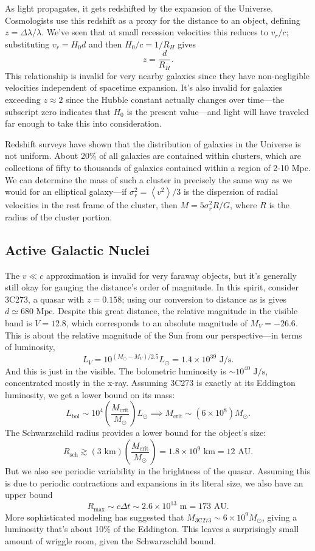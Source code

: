 \documentclass[../a062main.tex]{subfiles}
\begin{document}
As light propagates, it gets redshifted by the expansion of the Universe.
Cosmologists use this redshift as a proxy for the distance to an object, defining $z = \Delta \lambda / \lambda$.
We've seen that at small recession velocities this reduces to $v_r / c$; substituting $v_r = H_0d$ and then $H_0 / c = 1 / R_H$ gives
\[ \boxed{z = \frac{d}{R_H}}. \]
This relationship is invalid for very nearby galaxies since they have non-negligible velocities independent of spacetime expansion.
It's also invalid for galaxies exceeding $z \approx 2$ since the Hubble constant actually changes over time---the subscript zero indicates that $H_0$ is the present value---and light will have traveled far enough to take this into consideration.

Redshift surveys have shown that the distribution of galaxies in the Universe is not uniform.
About 20\% of all galaxies are contained within clusters, which are collections of fifty to thousands of galaxies contained within a region of 2-10 Mpc.
We can determine the mass of such a cluster in precisely the same way as we would for an elliptical galaxy---if $\sigma_r^2 = \left< v^2 \right> / 3$ is the dispersion of radial velocities in the rest frame of the cluster, then $M = 5 \sigma_r^2 R / G$, where $R$ is the radius of the cluster portion.


\subsection*{Active Galactic Nuclei}
The $v \ll c$ approximation is invalid for very faraway objects, but it's generally still okay for gauging the distance's order of magnitude.
In this spirit, consider 3C273, a quasar with $z = 0.158$; using our conversion to distance as is gives $d \simeq 680 \textrm{ Mpc}$.
Despite this great distance, the relative magnitude in the visible band is $V = 12.8$, which corresponds to an absolute magnitude of $M_V = -26.6$.
This is about the relative magnitude of the Sun from our perspective---in terms of luminosity,
\[ L_V = 10^{(M_\odot - M_V) / 2.5} L_\odot = 1.4 \times 10^{39} \textrm{ J/s}. \]
And this is just in the visible.
The bolometric luminosity is $\sim 10^{40} \textrm{ J/s}$, concentrated mostly in the x-ray.
Assuming 3C273 is exactly at its Eddington luminosity, we get a lower bound on its mass:
\[ L_\textrm{bol} \sim 10^{4} \left( \frac{M_\textrm{crit}}{M_\odot} \right) L_\odot \implies M_\textrm{crit} \sim (6 \times 10^{8}) M_\odot. \]
The Schwarzschild radius provides a lower bound for the object's size:
\[ R_\textrm{sch} \gtrsim (3 \textrm{ km}) \left( \frac{M_\textrm{crit}}{M_\odot} \right) = 1.8 \times 10^{9} \textrm{ km} = 12 \textrm{ AU}. \]
But we also see periodic variability in the brightness of the quasar.
Assuming this is due to periodic contractions and expansions in its literal size, we also have an upper bound
\[ R_\textrm{max} \sim c \Delta t \sim 2.6 \times 10^{13} \textrm{ m} = 173 \textrm{ AU}. \]
More sophisticated modeling has suggested that $M_\textrm{3C273} \sim 6 \times 10^{9} M_\odot$, giving a luminosity that's about 10\% of the Eddington.
This leaves a surprisingly small amount of wriggle room, given the Schwarzschild bound.
\end{document}
